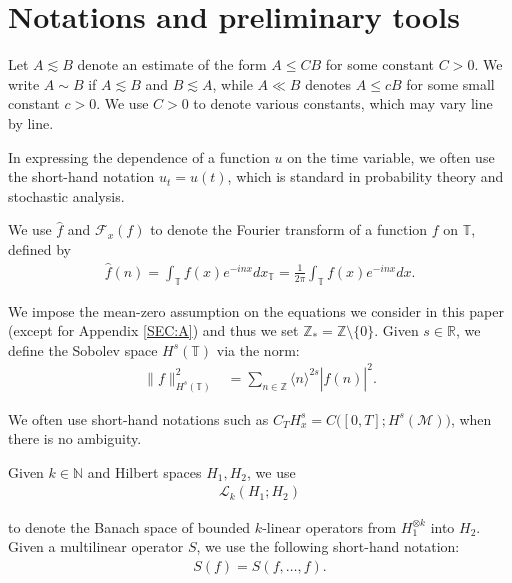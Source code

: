 \documentclass[letterpaper, 11pt,  reqno]{amsart}
\newcommand{\1}{\hspace{0.5mm}\text{I}\hspace{0.5mm}}
\newcommand{\noi}{\noindent}
\newcommand{\Z}{\mathbb{Z}}
\newcommand{\R}{\mathbb{R}}
\newcommand{\T}{\mathbb{T}}
\newcommand{\F}{\mathcal{F}}
\newcommand{\al}{\alpha}
\newcommand{\ft}{\widehat}
\newcommand{\les}{\lesssim}
\newcommand{\jb}[1]
{\langle #1 \rangle}
\newcommand{\M}{\mathcal{M}}
\newcommand{\N}{\mathbb{N}}
\newcommand{\cL}{\mathcal{L}}
\numberwithin{equation}{section}
\numberwithin{theorem}{section}
\begin{document}
\section{Notations and preliminary tools}
\label{SEC:2}


Let $A\les B$ denote an estimate of the form $A\leq CB$ for some constant $C>0$. We write $A\sim B$ if $A\les B$ and $B\les A$, while $A\ll B$ denotes $A\leq c B$ for some small constant $c> 0$. 
We use $C>0$ to denote various constants, which may vary line by line.



In expressing the dependence of a function $u$
on the time variable, we often use the short-hand notation
$u_t = u(t)$,  which is standard in probability theory and stochastic analysis.





We  use $\ft f$ and $\F_x(f)$
to denote
the  Fourier transform
of a function $f$ on $\T$, 
defined by 
\begin{align*}
\ft  f(n)=\int_{\T}f(x)e^{-i n x} d x_\T
= \frac 1 {2\pi}\int_{\T}f(x)e^{-i n x} d x.
\end{align*}

\noi
We impose the mean-zero assumption
on  the equations we consider in this paper
(except for Appendix \ref{SEC:A})
and thus we set  $\Z_* = \Z \setminus \{0\}$.
Given $s \in \R$, 
we define the  Sobolev space $H^{s}(\T)$ 
via the norm: 
\begin{align*}
\|  f  \|^2_{H^{s}(\T)}
& =
\sum_{n \in \Z} \jb{n}^{2s} |\ft f(n)|^2.
  \end{align*}


We often use short-hand notations such as
$C_T H^s_x  = C\big([0, T]; H^s(\M))$, 
 when there is no ambiguity.





Given $k \in \N$
and Hilbert spaces $H_1, H_2$,  
we use 
\begin{align*}
\cL_k(H_1; H_2)
\end{align*}

\noi
 to denote 
the Banach space of bounded $k$-linear operators 
from  $H_1^{\otimes k}$ into $H_2$.
Given a multilinear operator $S$, 
we use the following short-hand notation:
\begin{align}
S(f) = S(f, \dots, f).
\label{short1}
\end{align}
\end{document}
